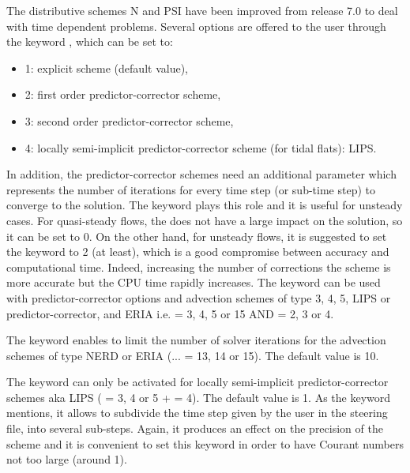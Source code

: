The distributive schemes N and PSI have been improved from release 7.0 to deal
with time dependent problems. Several options are offered to the user through
the keyword , which can be set to:
\begin{itemize}
\item 1: explicit scheme (default value),
\item 2: first order predictor-corrector scheme,
\item 3: second order predictor-corrector scheme,
\item 4: locally semi-implicit predictor-corrector scheme
(for tidal flats): LIPS.
\end{itemize}
In addition, the predictor-corrector schemes need an additional parameter
which represents the number of iterations for every time step (or sub-time step)
to converge to the solution.
The keyword 
plays this role and it is useful for unsteady cases.
For quasi-steady flows, the
does not have a large impact on the solution, so it can be set to 0.
On the other hand, for unsteady flows, it is suggested to set the keyword
 to 2 (at least),
which is a good compromise between accuracy and computational time.
Indeed, increasing the number of corrections the scheme is more accurate
but the CPU time rapidly increases.
The keyword  can be used
with predictor-corrector options and advection schemes of type
3, 4, 5, LIPS or predictor-corrector, and ERIA i.e.
 = 3, 4, 5 or 15 AND
 = 2, 3 or 4.

The keyword 
enables to limit the number of solver iterations for the advection schemes
of type NERD or ERIA (... = 13, 14 or 15).
The default value is 10.

The keyword  can only be
activated for locally semi-implicit predictor-corrector schemes aka LIPS
( = 3, 4 or 5
+  = 4).
The default value is 1.
As the keyword mentions, it allows to subdivide the time step given by the user
in the steering file, into several sub-steps.
Again, it produces an effect on the precision of the scheme and it is convenient
to set this keyword in order to have Courant numbers not too large (around 1).

